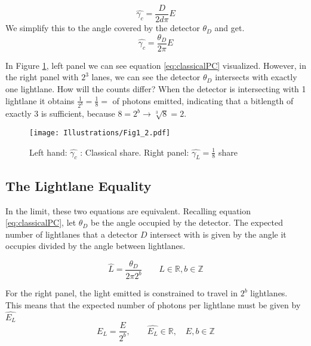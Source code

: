 \documentclass[notitlepage]{article}
\begin{document}
\begin{equation}\label{eq:classicalPC}
\hat{\gamma_c} =  \frac{D}{2d\pi}E 
\end{equation}
We simplify this to the angle covered by the detector $\theta_D$ and get.
\begin{equation}\label{eq:classicalPC}
\hat{\gamma_c} =  \frac{\theta_D}{2 \pi}E 
\end{equation}

In Figure \ref{fig:thepizza}, left panel we can see equation  \eqref{eq:classicalPC} visualized. However, in the right panel with $2^3$ lanes,  we can see the detector $\theta_D$ intersects with exactly one lightlane. How will the counts differ? When the detector is intersecting with 1 lightlane it obtains $\frac{1}{2^b}  = \frac{1}{8} =  $ of photons emitted, indicating that a bitlength of exactly 3 is sufficient, because $ 8 = 2^b \rightarrow \sqrt[3]{8}  = 2  $. 

\begin{figure}[!ht]
  \centering

 \texttt{[image: Illustrations/Fig1\_2.pdf]}
  \caption{Left hand: $\hat{\gamma_c}$ : Classical share. Right panel: $\hat{\gamma_L} = \frac{1}{8}$ share}
      \label{fig:thepizza}
\end{figure}

\subsection{The Lightlane Equality }
In the limit, these two equations are equivalent. Recalling equation \ref{eq:classicalPC}, let $\theta_D$ be the angle occupied by the detector. The expected number of lightlanes that a detector $D$ intersect with is given by the angle it occupies divided by the angle between lightlanes.

\begin{equation}
\hat{L} =   \frac{\theta_D }{ 2\pi 2^b } \quad\quad 	L \in \mathbb{R},b \in \mathbb{Z}
\label{eq:hatL}
\end{equation}

For the right panel, the light emitted is constrained to travel in $2^b$ lightlanes. This means that the expected number of photons per lightlane must be given by $\hat{E_L}$
\begin{equation}
 \hat{E_L} = \frac{E}{2^b}, \quad\quad	\hat{E_L} \in \mathbb{R}, \quad E, b \in \mathbb{Z}
 \label{eq:expectedPhotonsPerLane}
\end{equation}
\end{document}
